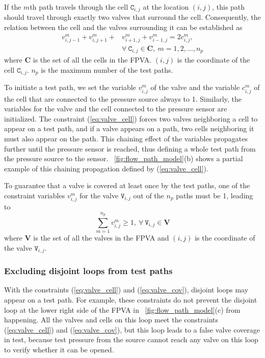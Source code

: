 \documentclass[journal,twoside]{IEEEtran}
\begin{document}
If the $m$th path travels through
the cell $\mathtt{C}_{i,j}$ at the location $(i,j)$, this path should travel through exactly 
two valves that surround the cell.
Consequently, the relation between the cell and the valves surrounding it can be
established as
\begin{align}
\label{eq:valve_cell}
v_{i, j-1}^m + v_{i, j+1}^m +& v_{i+1, j}^m + v_{i-1, j}^m=2c^m_{i,j}, \\  
&\forall\ \mathtt{C}_{i,j}\in \mathbf{C}, \ m=1, 2,\dots, n_p\nonumber
\end{align}
where $\mathbf{C}$ is the set of all the cells in the FPVA.
$(i,j)$ is the coordinate of the cell $\mathtt{C}_{i,j}$. 
$n_p$ is the maximum number of the
test paths.

To initiate a test path, we set the variable 
$v^m_{i,j}$ of the valve and the variable  
$c^m_{i,j}$ 
of the cell that are connected to the pressure source always 
to 1. Similarly, the variables for the valve and the cell connected to the
pressure sensor are initialized. 
The constraint (\ref{eq:valve_cell}) forces two valves neighboring a cell to
appear on a test path, and if a valve appears on a path, two cells
neighboring it must also appear on the path.
This chaining effect of the variables propagates further until the pressure
sensor is reached, thus defining a whole test path from the pressure
source to the sensor.
 \figname~\ref{fig:flow_path_model}(b) shows a partial example of this
chaining propagation defined by (\ref{eq:valve_cell}).

To guarantee that a valve is covered at least once by the test paths, 
one of the constraint variables $v^m_{i,j}$ for the valve 
$\mathtt{V}_{i,j}$ 
out of the $n_p$ paths 
must be 1, leading to
\begin{equation}
\label{eq:valve_cov}
\sum_{m=1}^{n_p}v^m_{i,j}\ge 1, \ \forall\ \mathtt{V}_{i,j}\in \mathbf{V}
\end{equation}
where $\mathbf{V}$ is the set of all the valves in the FPVA and $(i,j)$ is the
coordinate of the valve $\mathtt{V}_{i,j}$.


 


\subsubsection{Excluding disjoint loops from test paths}\label{sec:disjoint_loop}

With the constraints (\ref{eq:valve_cell}) and (\ref{eq:valve_cov}),
disjoint loops may appear on a test path. 
For example, these constraints do not prevent the disjoint loop at the lower right side of the
FPVA in \figname~\ref{fig:flow_path_model}(c) from happening. All the valves and cells on
this loop meet the constraints (\ref{eq:valve_cell}) and (\ref{eq:valve_cov}),
but this loop leads to a false valve coverage in test,
because test pressure from the source cannot reach 
any valve on this loop to verify whether it can be opened.
\end{document}

